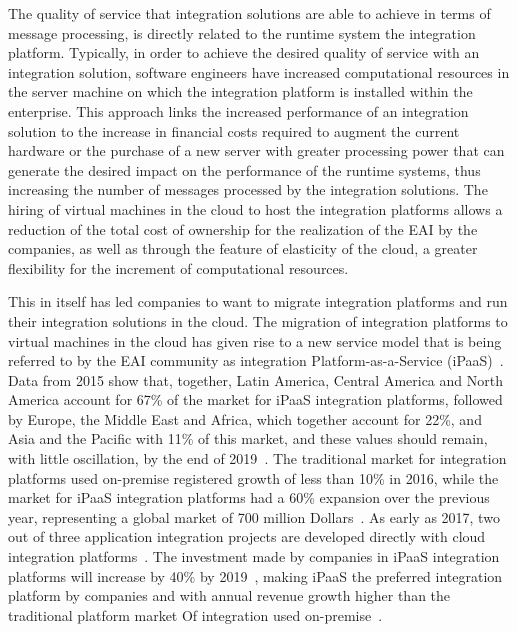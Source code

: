 The quality of service that integration solutions are able to achieve in terms of message processing, is directly related to the runtime system the integration platform. Typically, in order to achieve the desired quality of service with an integration solution, software engineers have increased computational resources in the server machine on which the integration platform is installed within the enterprise. This approach links the increased performance of an integration solution to the increase in financial costs required to augment the current hardware or the purchase of a new server with greater processing power that can generate the desired impact on the performance of the runtime systems, thus increasing the number of messages processed by the integration solutions.
The hiring of virtual machines in the cloud to host the integration platforms allows a reduction of the total cost of ownership for the realization of the EAI by the companies, as well as through the feature of elasticity of the cloud, a greater flexibility for the increment of computational resources.

This in itself has led companies to want to migrate integration platforms and run their integration solutions in the cloud. The migration of integration platforms to virtual machines in the cloud has given rise to a new service model that is being referred to by the EAI community as integration Platform-as-a-Service (iPaaS)~\cite{pezzini2011}. Data from 2015 show that, together, Latin America, Central America and North America account for 67\% of the market for iPaaS integration platforms, followed by Europe, the Middle East and Africa, which together account for 22\%, and Asia and the Pacific with 11\% of this market, and these values should remain, with little oscillation, by the end of 2019~\cite{sharma2015}. The traditional market for integration platforms used on-premise registered growth of less than 10\% in 2016, while the market for iPaaS integration platforms had a 60\% expansion over the previous year, representing a global market of 700 million Dollars~\cite{guttridge2017}. As early as 2017, two out of three application integration projects are developed directly with cloud integration platforms~\cite{pezzini2015}. The investment made by companies in iPaaS integration platforms will increase by 40\% by 2019~\cite{sharma2015}, making iPaaS the preferred integration platform by companies and with annual revenue growth higher than the traditional platform market Of integration used on-premise~\cite{guttridge2017,sharma2017}.

